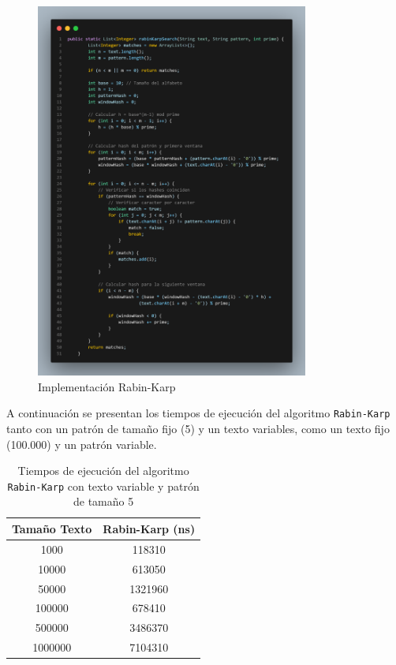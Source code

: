 \documentclass[12pt]{article}
\begin{document}
	\begin{figure}[H]
		\centering
		\includegraphics[width=0.8\textwidth]{RK.png}
		\caption{Implementación Rabin-Karp}
		\label{fig: Algoritmo Rabin-Karp}
	\end{figure}
	
	A continuación se presentan los tiempos de ejecución del algoritmo \texttt{Rabin-Karp}  tanto con un patrón de tamaño fijo (5) y un texto variables, como un texto fijo (100.000) y un patrón variable.
	
		\begin{table}[H]
		\centering
		\begin{tabular}{|c|c|}
			\hline
			\textbf{Tamaño Texto} & \textbf{Rabin-Karp (ns)} \\
			\hline
			1000     & 118310   \\
			10000    & 613050   \\
			50000    & 1321960  \\
			100000   & 678410   \\
			500000   & 3486370  \\
			1000000  & 7104310  \\
			\hline
		\end{tabular}
		\caption{Tiempos de ejecución del algoritmo \texttt{Rabin-Karp} con texto variable y patrón de tamaño 5}
		\label{tab:Rabin-Karp}
	\end{table}
	
\end{document}
